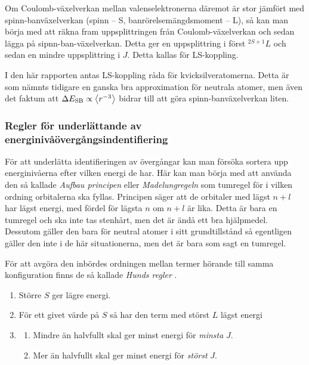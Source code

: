 \documentclass[11pt,a4paper]{article}
\begin{document}
Om Coulomb-växelverkan mellan valenselektronerna däremot är stor
jämfört med spinn-banväxelverkan (spinn -- S, banrörelsemängdsmoment
-- L), så kan man börja med att räkna fram uppsplittringen från
Coulomb-växelverkan och sedan lägga på sipnn-ban-växelverkan. Detta
ger en uppsplittring i först $^{2S+1}L$ och sedan en mindre
uppsplittring i $J$. Detta kallas för LS-koppling. 

I den här rapporten antas LS-koppling råda för
kvicksilveratomerna. Detta är som nämnts tidigare en ganska bra
approximation för neutrala atomer, men även det faktum att $\Delta
E_\text{SB} \propto \ev{r^{-3}}$ bidrar till att göra
spinn-banväxelverkan liten. 



\subsubsection{Regler för underlättande av energinivåövergångsindentifiering} 
\label{sec:regler}
För att underlätta identifieringen av övergångar kan man försöka
sortera upp energinivåerna efter vilken energi de har. Här kan man
börja med att använda den så kallade \emph{Aufbau principen} eller
\emph{Madelungregeln} som tumregel för i vilken ordning orbitalerna
ska fyllas\cite{wiki:aufbau}. Principen säger att de orbitaler med 
lägst $n+l$ har lägst energi, med fördel för lägsta $n$ om $n+l$ är
lika. Detta är bara en tumregel och ska inte tas stenhårt, men det 
är ändå ett bra hjälpmedel. Dessutom gäller den bara för neutral 
atomer i sitt grundtillstånd så egentligen gäller den inte i de här
situationerna, men det är bara som sagt en tumregel.

För att avgöra den inbördes ordningen mellan termer hörande till samma
konfiguration finns de så kallade \emph{Hunds regler} \cite{Bransden}. 
\begin{enumerate}
    \item Större $S$ ger lägre energi.
    \item För ett givet värde på $S$ så har den term med störst $L$ lägst energi
    \item 
    \begin{enumerate}
        \item Mindre än halvfullt skal ger minst energi för \emph{minsta} $J$.
        \item Mer än halvfullt skal ger minst energi för \emph{störst} $J$.
    \end{enumerate}
\end{enumerate}
\end{document}
